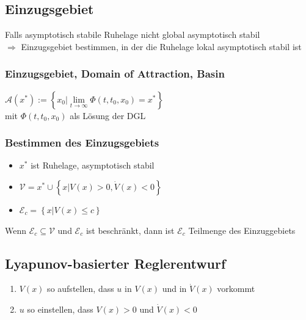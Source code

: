 \documentclass[german]{latex4ei/latex4ei_sheet}
\begin{document}
\begin{sectionbox}
\subsection{Einzugsgebiet}
Falls asymptotisch stabile Ruhelage nicht global asymptotisch stabil \\
$\Rightarrow$ Einzugsgebiet bestimmen, in der die Ruhelage lokal asymptotisch stabil ist

\subsubsection{Einzugsgebiet, Domain of Attraction, Basin}
$\mathcal{A}(x^*) := \left\{ x_0 | \lim\limits_{t \rightarrow \infty} \Phi(t,t_0,x_0) = x^* \right\}$ \\
mit $\Phi(t,t_0,x_0)$ als Lösung der DGL

\subsubsection{Bestimmen des Einzugsgebiets}
\begin{itemize}
  \item $x^*$ ist Ruhelage, asymptotisch stabil
  \item $\mathcal{V} = {x^*} \cup \left\{ x | V(x) > 0, \dot{V}(x) < 0 \right\}$
  \item $\mathcal{E}_c = \left\{ x | V(x) \leq c \right\}$
\end{itemize}
Wenn $\mathcal{E}_c \subseteq \mathcal{V}$ und $\mathcal{E}_c$ ist beschränkt, dann ist $\mathcal{E}_c$ Teilmenge des Einzuggebiets

\subsection{Lyapunov-basierter Reglerentwurf}
\begin{enumerate}
  \item $V(x)$ so aufstellen, dass $u$ in $V(x)$ und in $\dot{V}(x)$ vorkommt
  \item $u$ so einstellen, dass $V(x) > 0$ und $\dot{V}(x) < 0$
\end{enumerate}
\end{sectionbox}
\end{document}
